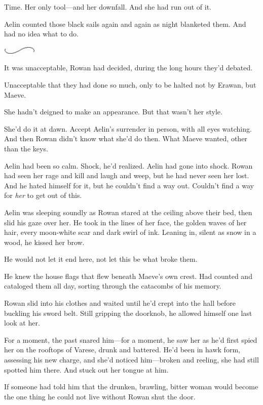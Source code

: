 Time. Her only tool---and her downfall. And she had run out of it.

Aelin counted those black sails again and again as night blanketed them. And had no idea what to do.

\includegraphics[width=0.65in,height=0.13in]{images/seperator}

It was unacceptable, Rowan had decided, during the long hours they'd debated.

Unacceptable that they had done so much, only to be halted not by Erawan, but Maeve.

She hadn't deigned to make an appearance. But that wasn't her style.

She'd do it at dawn. Accept Aelin's surrender in person, with all eyes watching. And then  Rowan didn't know what she'd do then. What Maeve wanted, other than the keys.

Aelin had been so calm. Shock, he'd realized. Aelin had gone into shock. Rowan had seen her rage and kill and laugh and weep, but he had never seen her  lost. And he hated himself for it, but he couldn't find a way out. Couldn't find a way for \emph{her} to get out of this.

Aelin was sleeping soundly as Rowan stared at the ceiling above their bed, then slid his gaze over her. He took in the lines of her face, the golden waves of her hair, every moon-white scar and dark swirl of ink. Leaning in, silent as snow in a wood, he kissed her brow.

He would not let it end here, not let this be what broke them.

He knew the house flags that flew beneath Maeve's own crest. Had counted and cataloged them all day, sorting through the catacombs of his memory.

Rowan slid into his clothes and waited until he'd crept into the hall before buckling his sword belt. Still gripping the doorknob, he allowed himself one last look at her.

For a moment, the past snared him---for a moment, he saw her as he'd first spied her on the rooftops of Varese, drunk and battered. He'd been in hawk form, assessing his new charge, and she'd noticed him---broken and reeling, she had still spotted him there. And stuck out her tongue at him.

If someone had told him that the drunken, brawling, bitter woman would become the one thing he could not live without  Rowan shut the door.

